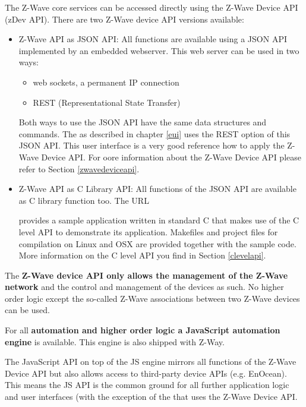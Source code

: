 The Z-Wave core services can be accessed directly using the Z-Wave Device API (zDev API). 
There are two Z-Wave device API versions available:
\begin{itemize}
\item Z-Wave API as JSON API: All functions are available using a JSON API implemented 
by an embedded webserver. This web server can be used in two ways:
\begin{itemize}
\item web sockets, a permanent IP connection
\item REST (Representational State Transfer)
\end{itemize}
Both ways to use the JSON API have the same data structures and commands. The 
\zweui as described in chapter \ref{eui} uses the REST option of this JSON API. This user 
interface is a very good reference how to apply the Z-Wave Device API. For oore 
information about the Z-Wave Device API please refer to Section \ref{zwavedeviceapi}.

\item Z-Wave API as C Library API: All functions of the JSON API are available as C 
library function too. The URL


provides a sample application written in standard C that makes use of the C level 
API to demonstrate its application. Makefiles and project files for compilation on 
Linux and OSX are provided together with the sample code. More information on the C 
level API you find in Section \ref{clevelapi}.

\end{itemize}


The \textbf{Z-Wave device API only allows the management of the Z-Wave network} and 
the control and management of the devices as such. No higher order logic except the 
so-called Z-Wave associations between two Z-Wave devices can be used.

For all \textbf{automation and higher order logic a JavaScript automation engine} 
is available. This engine is also shipped with Z-Way.

The JavaScript API on top of the JS engine mirrors all functions of the Z-Wave Device API 
but also allows access to third-party  device APIs (e.g. EnOcean). This means the JS API 
is the common ground for all further application logic and user interfaces (with the 
exception of the \zweui that uses the Z-Wave Device API.

